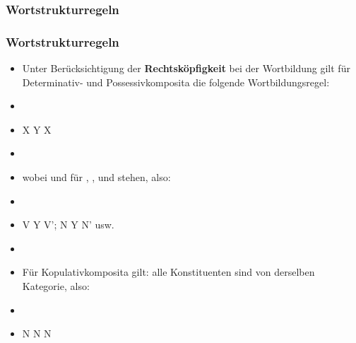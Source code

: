 \subsubsection{Wortstrukturregeln}


\begin{frame}
\frametitle{Wortstrukturregeln}

\begin{itemize}
	\item Unter Berücksichtigung der \textbf{Rechtsköpfigkeit} bei der Wortbildung gilt für Determinativ- und Possessivkomposita die folgende Wortbildungsregel:
	\item[]
	\item X \ras Y X
	\item[]
	\item wobei  und  für , ,  und  stehen, also:
	\item[]
	\item V \ras Y V'; N \ras Y N' usw.
	\item 	
	\item Für Kopulativkomposita gilt: alle Konstituenten sind von derselben Kategorie, also:
	\item[]
	\item N \ras N N 
\end{itemize}


\end{frame}


